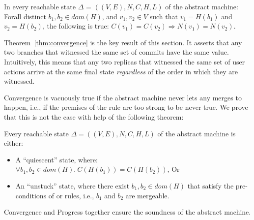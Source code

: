 \begin{theorem}[{\bf Convergence}]
  \label{thm:convergence}
  In every reachable state $\Delta$ = $((V,E),N,C,H,L)$ of the abstract
  machine: Forall distinct $b_1, b_2 \in dom(H)$, and $v_1, v_2 \in V$
  such that $v_1 = H(b_1)$ and $v_2 = H(b_2)$, the following is true:
  $C(v_1) = C(v_2) \Rightarrow N(v_1) = N(v_2)$.
\end{theorem}

Theorem~\ref{thm:convergence} is the key result of this section. It
asserts that any two branches that witnessed the same set of commits
have the same value. Intuitively, this means that any two replicas
that witnessed the same set of user actions arrive at the same final
state \emph{regardless} of the order in which they are witnessed. 

Convergence is vacuously true if the abstract machine never lets any
merges to happen, i.e., if the premises of the  rule
are too strong to be never true. We prove that this is not the case
with help of the following theorem:

\begin{theorem}[{\bf Progress}]
  \label{thm:progress}
  Every reachable state $\Delta = ((V,E),N,C,H,L)$ of the abstract
  machine is either: 
  \begin{itemize}
    \item A ``quiescent'' state, where: $\forall b_1,b_2 \in
      dom(H).~C(H(b_1)) = C(H(b_2))$, Or
    \item An ``unstuck'' state, where there exist $b_1,b_2 \in dom(H)$
      that satisfy the pre-conditions of  or
       rules, i.e., $b_1$ and $b_2$ are mergeable. 
  \end{itemize}
\end{theorem}

Convergence and Progress together ensure the soundness of the \quark
abstract machine.
